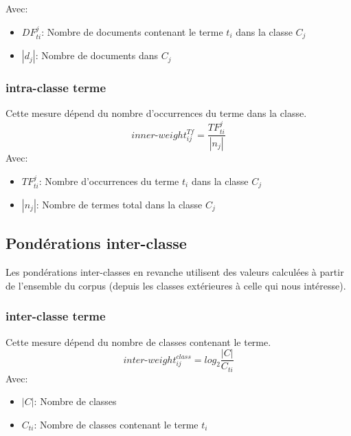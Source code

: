 \documentclass{article}
\begin{document}
      Avec:
  \begin{itemize}
  	\item $DF_{ti}^j$: Nombre de documents contenant le terme $t_i$ dans la classe $C_j$	
  	\item $|d_{j}|$: Nombre de documents dans $C_j$	
    \end{itemize}
\subsubsection*{intra-classe terme}
Cette mesure dépend du nombre d'occurrences du terme dans la classe.
\[   inner\mbox{-}weight_{ij}^{Tf} = \frac{TF_{ti}^j}{|n_{j}|}\]
  Avec:
\begin{itemize}
	\item $TF_{ti}^j$: Nombre d'occurrences du terme $t_i$ dans la classe $C_j$	
	\item $|n_{j}|$: Nombre de termes total dans la classe $C_j$	
  \end{itemize}
\subsection{Pondérations inter-classe}
Les pondérations inter-classes en revanche utilisent des valeurs calculées à partir de l'ensemble du corpus (depuis les classes extérieures à celle qui nous intéresse).
\subsubsection*{inter-classe terme}
Cette mesure dépend du nombre de classes contenant le terme.
\[inter\mbox{-}weight_{ij}^{class} = log_2 \frac{|C|}{C_{ti}}\]
Avec:
\begin{itemize}
	\item $|C|$: Nombre de classes			
	\item $C_{ti}$: Nombre de classes contenant le terme $t_i$
  \end{itemize}
\end{document}
